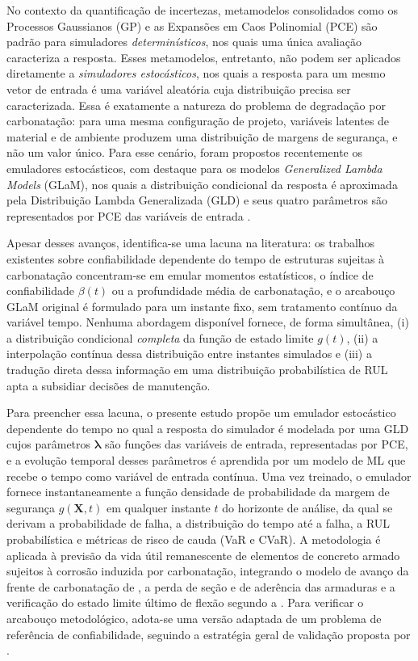 No contexto da quantificação de incertezas, metamodelos consolidados como os Processos Gaussianos (GP) \parencite{rasmussen2006} e as Expansões em Caos Polinomial (PCE) \parencite{xiu2002, blatman2011} são padrão para simuladores \textit{determinísticos}, nos quais uma única avaliação caracteriza a resposta. Esses metamodelos, entretanto, não podem ser aplicados diretamente a \textit{simuladores estocásticos}, nos quais a resposta para um mesmo vetor de entrada é uma variável aleatória cuja distribuição precisa ser caracterizada. Essa é exatamente a natureza do problema de degradação por carbonatação: para uma mesma configuração de projeto, variáveis latentes de material e de ambiente produzem uma distribuição de margens de segurança, e não um valor único. Para esse cenário, foram propostos recentemente os emuladores estocásticos, com destaque para os modelos \textit{Generalized Lambda Models} (GLaM), nos quais a distribuição condicional da resposta é aproximada pela Distribuição Lambda Generalizada (GLD) e seus quatro parâmetros são representados por PCE das variáveis de entrada \parencite{ZhuSudret2020, ZhuSudret2021}.

Apesar desses avanços, identifica-se uma lacuna na literatura: os trabalhos existentes sobre confiabilidade dependente do tempo de estruturas sujeitas à carbonatação concentram-se em emular momentos estatísticos, o índice de confiabilidade $\beta(t)$ ou a profundidade média de carbonatação, e o arcabouço GLaM original é formulado para um instante fixo, sem tratamento contínuo da variável tempo. Nenhuma abordagem disponível fornece, de forma simultânea, (i) a distribuição condicional \textit{completa} da função de estado limite $g(t)$, (ii) a interpolação contínua dessa distribuição entre instantes simulados e (iii) a tradução direta dessa informação em uma distribuição probabilística de RUL apta a subsidiar decisões de manutenção.

Para preencher essa lacuna, o presente estudo propõe um emulador estocástico dependente do tempo no qual a resposta do simulador é modelada por uma GLD cujos parâmetros $\boldsymbol{\lambda}$ são funções das variáveis de entrada, representadas por PCE, e a evolução temporal desses parâmetros é aprendida por um modelo de ML que recebe o tempo como variável de entrada contínua. Uma vez treinado, o emulador fornece instantaneamente a função densidade de probabilidade da margem de segurança $g(\mathbf{X}, t)$ em qualquer instante $t$ do horizonte de análise, da qual se derivam a probabilidade de falha, a distribuição do tempo até a falha, a RUL probabilística e métricas de risco de cauda (VaR e CVaR). A metodologia é aplicada à previsão da vida útil remanescente de elementos de concreto armado sujeitos à corrosão induzida por carbonatação, integrando o modelo de avanço da frente de carbonatação de \textcite{possan2010}, a perda de seção e de aderência das armaduras \parencite{val1997, azad2010, peng2016} e a verificação do estado limite último de flexão segundo a \textcite{nbr6118}. Para verificar o arcabouço metodológico, adota-se uma versão adaptada de um problema de referência de confiabilidade, seguindo a estratégia geral de validação proposta por \textcite{pires2024}.

